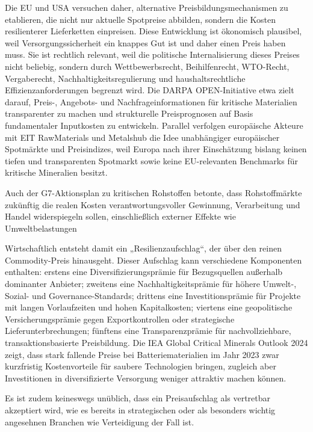 \documentclass[12pt,a4paper,oneside]{book} %
\begin{document}
Die EU und USA versuchen daher, alternative Preisbildungsmechanismen zu etablieren, die nicht nur aktuelle Spotpreise abbilden, sondern die Kosten resilienterer Lieferketten einpreisen. Diese Entwicklung ist ökonomisch plausibel, weil Versorgungssicherheit ein knappes Gut ist und daher einen Preis haben muss. Sie ist rechtlich relevant, weil die politische Internalisierung dieses Preises nicht beliebig, sondern durch Wettbewerbsrecht, Beihilfenrecht, WTO-Recht, Vergaberecht, Nachhaltigkeitsregulierung und haushaltsrechtliche Effizienzanforderungen begrenzt wird. Die DARPA OPEN-Initiative etwa zielt darauf, Preis-, Angebots- und Nachfrageinformationen für kritische Materialien transparenter zu machen und strukturelle Preisprognosen auf Basis fundamentaler Inputkosten zu entwickeln.  Parallel verfolgen europäische Akteure mit EIT RawMaterials und Metalshub die Idee unabhängiger europäischer Spotmärkte und Preisindizes, weil Europa nach ihrer Einschätzung bislang keinen tiefen und transparenten Spotmarkt sowie keine EU-relevanten Benchmarks für kritische Mineralien besitzt.

Auch der G7-Aktionsplan zu kritischen Rohstoffen betonte, dass Rohstoffmärkte zukünftig die realen Kosten verantwortungsvoller Gewinnung, Verarbeitung und Handel widerspiegeln sollen, einschließlich externer Effekte wie Umweltbelastungen

Wirtschaftlich entsteht damit ein „Resilienzaufschlag“, der über den reinen Commodity-Preis hinausgeht. Dieser Aufschlag kann verschiedene Komponenten enthalten: erstens eine Diversifizierungsprämie für Bezugsquellen außerhalb dominanter Anbieter; zweitens eine Nachhaltigkeitsprämie für höhere Umwelt-, Sozial- und Governance-Standards; drittens eine Investitionsprämie für Projekte mit langen Vorlaufzeiten und hohen Kapitalkosten; viertens eine geopolitische Versicherungsprämie gegen Exportkontrollen oder strategische Lieferunterbrechungen; fünftens eine Transparenzprämie für nachvollziehbare, transaktionsbasierte Preisbildung. Die IEA Global Critical Minerals Outlook 2024 zeigt, dass stark fallende Preise bei Batteriematerialien im Jahr 2023 zwar kurzfristig Kostenvorteile für saubere Technologien bringen, zugleich aber Investitionen in diversifizierte Versorgung weniger attraktiv machen können.

Es ist zudem keineswegs unüblich, dass ein Preisaufschlag als vertretbar akzeptiert wird, wie es bereits in strategischen oder als besonders wichtig angesehnen Branchen wie Verteidigung der Fall ist.
\end{document}
